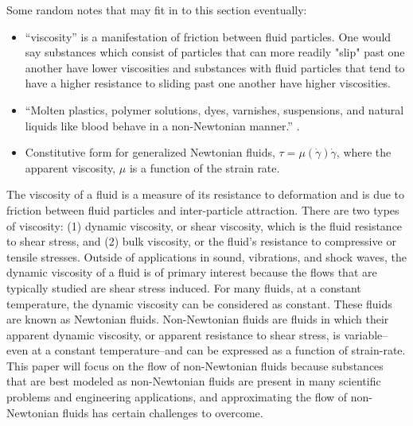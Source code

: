\documentclass{article}
\begin{document}
{\color{red}
Some random notes that may fit in to this section eventually:
\begin{itemize}
\item ``viscosity'' is a manifestation of friction between fluid particles.
One would say substances which consist of particles that can more readily "slip" past one another have lower viscosities and substances with fluid particles that tend to have a higher resistance to sliding past one another have higher viscosities.

\item ``Molten plastics, polymer solutions, dyes, varnishes, suspensions, and natural liquids like blood behave in a non-Newtonian manner.'' \cite{bohme1987non}.

\item Constitutive form for generalized Newtonian fluids, $\tau = \mu(\dot{\gamma}) \dot{\gamma}$, where the apparent viscosity, $\mu$ is a function of the strain rate.
\end{itemize}
}

The viscosity of a fluid is a measure of its resistance to deformation and is due to friction between fluid particles and inter-particle attraction.
There are two types of viscosity: (1) dynamic viscosity, or shear viscosity, which is the fluid resistance to shear stress, and (2) bulk viscosity, or the fluid's resistance to compressive or tensile stresses.
Outside of applications in sound, vibrations, and shock waves, the dynamic viscosity of a fluid is of primary interest because the flows that are typically studied are shear stress induced.
For many fluids, at a constant temperature, the dynamic viscosity can be considered as constant.
These fluids are known as Newtonian fluids.
Non-Newtonian fluids are fluids in which their apparent dynamic viscosity, or apparent resistance to shear stress, is variable--even at a constant temperature--and can be expressed as a function of strain-rate.
This paper will focus on the flow of non-Newtonian fluids because substances that are best modeled as non-Newtonian fluids are present in many scientific problems and engineering applications, and approximating the flow of non-Newtonian fluids has certain challenges to overcome.
\end{document}
